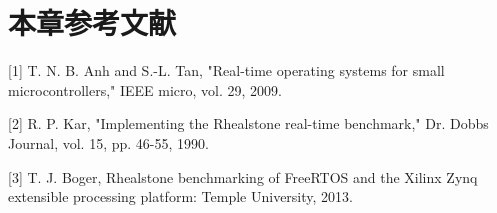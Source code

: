 \section{本章参考文献}\label{sec:chapter-bibliography}

\protect{}\label{sec:chapter-bibliography-2}{[}1{]}
T. N. B. Anh and S.-L. Tan, "Real-time operating systems for small
microcontrollers," IEEE micro, vol. 29, 2009.

{[}2{]} R. P. Kar, "Implementing the Rhealstone real-time benchmark,"
Dr. Dobb\textquotesingle s Journal, vol. 15, pp. 46-55, 1990.

{[}3{]} T. J. Boger, Rhealstone benchmarking of FreeRTOS and the Xilinx
Zynq extensible processing platform: Temple University, 2013.
